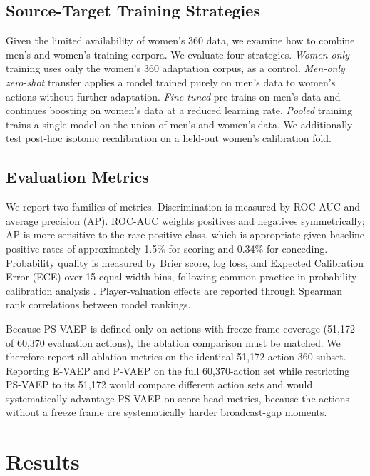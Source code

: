 \documentclass[runningheads]{llncs}
\begin{document}
\subsection{Source-Target Training Strategies}

Given the limited availability of women's 360 data, we examine how to combine men's and women's training corpora. We evaluate four strategies. \emph{Women-only} training uses only the women's 360 adaptation corpus, as a control. \emph{Men-only zero-shot} transfer applies a model trained purely on men's data to women's actions without further adaptation. \emph{Fine-tuned} pre-trains on men's data and continues boosting on women's data at a reduced learning rate. \emph{Pooled} training trains a single model on the union of men's and women's data. We additionally test post-hoc isotonic recalibration on a held-out women's calibration fold.

\subsection{Evaluation Metrics}

We report two families of metrics. Discrimination is measured by ROC-AUC and average precision (AP). ROC-AUC weights positives and negatives symmetrically; AP is more sensitive to the rare positive class, which is appropriate given baseline positive rates of approximately 1.5\% for scoring and 0.34\% for conceding. Probability quality is measured by Brier score, log loss, and Expected Calibration Error (ECE) over 15 equal-width bins, following common practice in probability calibration analysis \cite{guo2017calibration}. Player-valuation effects are reported through Spearman rank correlations between model rankings.

Because PS-VAEP is defined only on actions with freeze-frame coverage (51{,}172 of 60{,}370 evaluation actions), the ablation comparison must be matched. We therefore report all ablation metrics on the identical 51{,}172-action 360 subset. Reporting E-VAEP and P-VAEP on the full 60{,}370-action set while restricting PS-VAEP to its 51{,}172 would compare different action sets and would systematically advantage PS-VAEP on score-head metrics, because the actions without a freeze frame are systematically harder broadcast-gap moments.

\section{Results}
\end{document}
